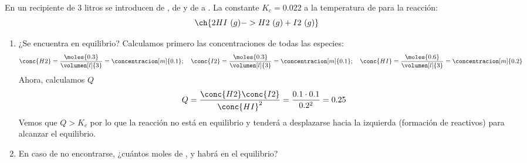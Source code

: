     \begin{example}
        En un recipiente de 3 litros se introducen  de ,  de  y  de  a .
        La constante  $K_c = 0.022$ a la temperatura de  para la reacción:
        \begin{equation*}
            \ch{2 HI\ (g) -> H2\ (g) + I2\ (g)}
        \end{equation*}
        \begin{enumerate}[label=\letraminuscula]
            \item ¿Se encuentra en equilibrio?
            Calculamos primero las concentraciones de todas las especies:
            \begin{gather*}
                \conc{H2} = \dfrac{\moles{0.3}}{\volumen[l]{3}} = \concentracion[m]{0.1}; \quad \conc{I2} = \dfrac{\moles{0.3}}{\volumen[l]{3}} = \concentracion[m]{0.1}; \quad \conc{HI} = \dfrac{\moles{0.6}}{\volumen[l]{3}} = \concentracion[m]{0.2}
            \end{gather*}
            Ahora, calculamos \( Q \)
            \begin{equation*}
                Q = \dfrac{\conc{H2}\conc{I2}}{\conc{HI}^2} = \dfrac{0.1\cdot 0.1}{0.2^2} = 0.25
            \end{equation*}
            Vemos que $Q>K_c$ por lo que la reacción no está en equilibrio y tenderá a desplazarse hacia la izquierda (formación de reactivos) para alcanzar el equilibrio.
            \item En caso de no encontrarse, ¿cuántos moles de ,  y  habrá en el equilibrio?


\end{enumerate}
\end{example}
